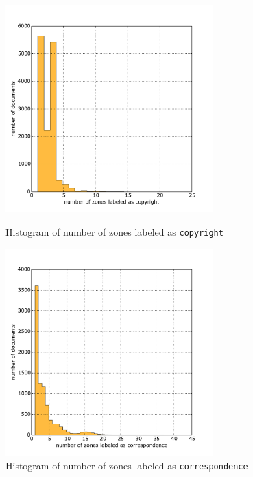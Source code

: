 \begin{appendix}
\begin{figure}
\centering
\begin{minipage}[t!]{0.48\linewidth}
  \includegraphics[width=8cm]{plots/copyright_histogram}
  \caption{Histogram of number of zones labeled as \texttt{copyright}}
  \label{fig:copyright_histogram}
\end{minipage}
\quad
\begin{minipage}[t!]{0.48\linewidth}
  \includegraphics[width=8cm]{plots/correspondence_histogram}
  \caption{Histogram of number of zones labeled as \texttt{correspondence}}
  \label{fig:correspondence_histogram}
\end{minipage}
\end{figure}


\end{appendix}
